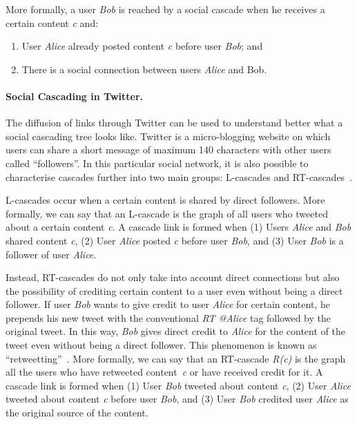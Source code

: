 More formally, a user \emph{Bob} is reached by a social cascade when he receives a certain content
\emph{c} and:
\begin{enumerate}
\singlespacing
	\item User \emph{Alice} already posted content \emph{c} before user \emph{Bob}; and
	\item There is a social connection between users \emph{Alice} and {Bob}.
\end{enumerate}
\paragraph{Social Cascading in Twitter.}
The diffusion of links through Twitter can be used to understand better what a social cascading tree
looks like. Twitter is a micro-blogging website on which users can share a short message of maximum 140
characters with other users called ``followers''. In this particular social network, it is also possible
to characterise cascades further into two main groups: L-cascades and RT-cascades~\cite{outweeting}.

L-cascades occur when a certain content is shared by direct followers. More formally, we can
say that an L-cascade is the graph of all users who tweeted about a certain content \emph{c}. A cascade
link is formed when (1) Users \emph{Alice} and \emph{Bob} shared content \emph{c}, (2) User
\emph{Alice} posted \emph{c} before user \emph{Bob}, and (3) User \emph{Bob} is a follower of user
\emph{Alice}.

Instead, RT-cascades do not only take into account direct connections but also the
possibility of crediting certain content to a user even without being a direct follower. If user
\emph{Bob} wants to give credit to user \emph{Alice} for certain content, he prepends his new tweet
with the conventional \emph{RT @Alice} tag followed by the original tweet. In this way, \emph{Bob} gives
direct credit to \emph{Alice} for the content of the tweet even without being a direct follower. This
phenomenon is known as ``retweetting''~\cite{retweet}. More formally, we can say that an RT-cascade
\emph{R(c)} is the graph all the users who have retweeted content~\emph{c} or have received credit for
it.
A cascade link is formed when (1) User \emph{Bob} tweeted about content \emph{c}, (2) User \emph{Alice}
tweeted about content \emph{c} before user \emph{Bob}, and (3) User \emph{Bob} credited user \emph{Alice}
as the original source of the content.
\vspace{-0.5cm}
